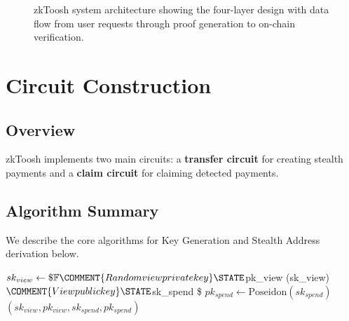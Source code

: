 \documentclass[conference]{IEEEtran}
\begin{document}
\begin{figure}[t]
{
}
\caption{zkToosh system architecture showing the four-layer design with data flow from user requests through proof generation to on-chain verification.}
\label{fig:architecture}
\end{figure}

% 
% 
\section{Circuit Construction}
\label{sec:construction}

\subsection{Overview}

zkToosh implements two main circuits: a \textbf{transfer circuit} for creating stealth payments and a \textbf{claim circuit} for claiming detected payments.

\subsection{Algorithm Summary}

We describe the core algorithms for Key Generation and Stealth Address derivation below.

\begin{algorithm}[t]
\caption{KeyGen($\lambda$)}
\label{alg:keygen}
\begin{algorithmic}[1]
\STATE $sk_{view} \leftarrow\$ \mathbb{F} \COMMENT{Random view private key}
\STATE $pk_{view} \leftarrow {}(sk_{view})$ \COMMENT{View public key}
\STATE $sk_{spend} \leftarrow\$  
\STATE $pk_{spend} \leftarrow \text{Poseidon}(sk_{spend})$ 
\RETURN $(sk_{view}, pk_{view}, sk_{spend}, pk_{spend})$
\end{algorithmic}
\end{algorithm}
\end{document}
